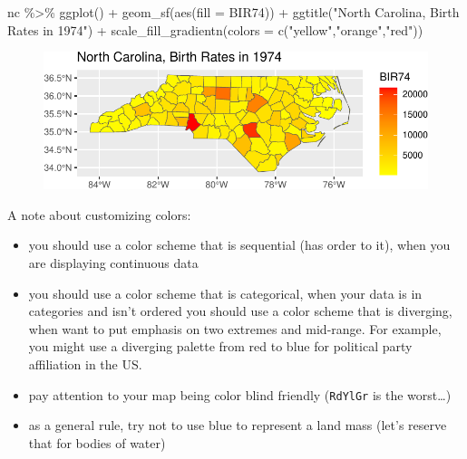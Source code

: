 \documentclass[
  letterpaper,
  DIV=11,
  numbers=noendperiod]{scrartcl}
\newenvironment{Shaded}{\begin{snugshade}}{\end{snugshade}}
\newcommand{\AttributeTok}[1]{\textcolor[rgb]{0.40,0.45,0.13}{#1}}
\newcommand{\FunctionTok}[1]{\textcolor[rgb]{0.28,0.35,0.67}{#1}}
\newcommand{\NormalTok}[1]{\textcolor[rgb]{0.00,0.23,0.31}{#1}}
\newcommand{\SpecialCharTok}[1]{\textcolor[rgb]{0.37,0.37,0.37}{#1}}
\newcommand{\StringTok}[1]{\textcolor[rgb]{0.13,0.47,0.30}{#1}}
\providecommand{\tightlist}{%
  \setlength{\itemsep}{0pt}\setlength{\parskip}{0pt}}\usepackage{longtable,booktabs,array}
\begin{document}
\begin{Shaded}
\begin{Highlighting}[]
\NormalTok{nc }\SpecialCharTok{\%\textgreater{}\%}
  \FunctionTok{ggplot}\NormalTok{() }\SpecialCharTok{+}
  \FunctionTok{geom\_sf}\NormalTok{(}\FunctionTok{aes}\NormalTok{(}\AttributeTok{fill =}\NormalTok{ BIR74)) }\SpecialCharTok{+}
  \FunctionTok{ggtitle}\NormalTok{(}\StringTok{"North Carolina, Birth Rates in 1974"}\NormalTok{) }\SpecialCharTok{+}
  \FunctionTok{scale\_fill\_gradientn}\NormalTok{(}\AttributeTok{colors =} \FunctionTok{c}\NormalTok{(}\StringTok{"yellow"}\NormalTok{,}\StringTok{"orange"}\NormalTok{,}\StringTok{"red"}\NormalTok{))}
\end{Highlighting}
\end{Shaded}

\begin{figure}[H]

{\centering \includegraphics{118_K_maps1_files/figure-pdf/unnamed-chunk-15-1.pdf}

}

\end{figure}

A note about customizing colors:

\begin{itemize}
\tightlist
\item
  you should use a color scheme that is sequential (has order to it),
  when you are displaying continuous data
\item
  you should use a color scheme that is categorical, when your data is
  in categories and isn't ordered you should use a color scheme that is
  diverging, when want to put emphasis on two extremes and mid-range.
  For example, you might use a diverging palette from red to blue for
  political party affiliation in the US.
\item
  pay attention to your map being color blind friendly (\texttt{RdYlGr}
  is the worst\ldots)
\item
  as a general rule, try not to use blue to represent a land mass (let's
  reserve that for bodies of water)
\end{itemize}
\end{document}
